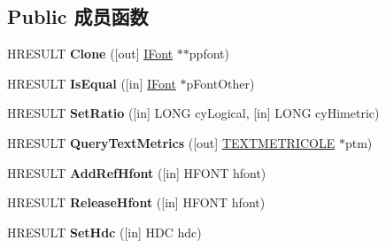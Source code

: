 \subsection*{Public 成员函数}
\begin{DoxyCompactItemize}
\item 
\mbox{\label{interface_i_font_a46603b231e18ab1e11bffca4a160bd91}} 
H\+R\+E\+S\+U\+LT {\bfseries Clone} (\mbox{[}out\mbox{]} \hyperlink{interface_i_font}{I\+Font} $\ast$$\ast$ppfont)
\item 
\mbox{\label{interface_i_font_a577d6dff03871c4252e61cc331816e8e}} 
H\+R\+E\+S\+U\+LT {\bfseries Is\+Equal} (\mbox{[}in\mbox{]} \hyperlink{interface_i_font}{I\+Font} $\ast$p\+Font\+Other)
\item 
\mbox{\label{interface_i_font_ab83b20970f35e005514d7a8a477bb66b}} 
H\+R\+E\+S\+U\+LT {\bfseries Set\+Ratio} (\mbox{[}in\mbox{]} L\+O\+NG cy\+Logical, \mbox{[}in\mbox{]} L\+O\+NG cy\+Himetric)
\item 
\mbox{\label{interface_i_font_a82f8f129d2f176ebe6050f0bf2447773}} 
H\+R\+E\+S\+U\+LT {\bfseries Query\+Text\+Metrics} (\mbox{[}out\mbox{]} \hyperlink{structtag_t_e_x_t_m_e_t_r_i_c_w}{T\+E\+X\+T\+M\+E\+T\+R\+I\+C\+O\+LE} $\ast$ptm)
\item 
\mbox{\label{interface_i_font_ae1390eebbf3e0297cda010da2098d902}} 
H\+R\+E\+S\+U\+LT {\bfseries Add\+Ref\+Hfont} (\mbox{[}in\mbox{]} H\+F\+O\+NT hfont)
\item 
\mbox{\label{interface_i_font_a07c22819c736996a29a8fa7cdb69b17b}} 
H\+R\+E\+S\+U\+LT {\bfseries Release\+Hfont} (\mbox{[}in\mbox{]} H\+F\+O\+NT hfont)
\item 
\mbox{\label{interface_i_font_a688657a66f8d90e2103012b4b8c9ed1a}} 
H\+R\+E\+S\+U\+LT {\bfseries Set\+Hdc} (\mbox{[}in\mbox{]} H\+DC hdc)
\end{DoxyCompactItemize}
